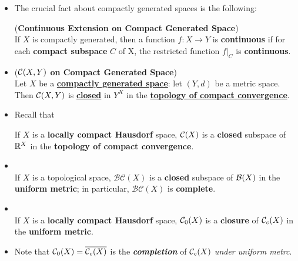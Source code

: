 \documentclass[11pt]{article}
\begin{document}
\begin{itemize}
\item The crucial fact about compactly generated spaces is the following:
\begin{lemma} (\textbf{Continuous Extension on Compact Generated Space})  \citep{munkres2000topology}\\
If $X$ is compactly generated, then a function $f : X \rightarrow Y$ is \textbf{continuous} if for each \textbf{compact subspace} $C$ of X, the restricted function $f |_{C}$ is \textbf{continuous}.
\end{lemma}

\item \begin{theorem} (\textbf{${\mathcal C}(X, Y)$ on Compact Generated Space})  \citep{munkres2000topology}\\
Let $X$ be a \underline{\textbf{compactly generated space}}: let $(Y, d)$ be a metric space. Then ${\mathcal C}(X, Y)$ is \underline{\textbf{closed}} in $Y^X$ in the \underline{\textbf{topology of compact convergence}}.
\end{theorem}

\item Recall that 
\begin{proposition}
If $X$ is a \textbf{locally compact Hausdorf} space, ${\mathcal C}(X)$ is a \textbf{closed} subspace of ${\mathbb R}^{X}$ in the \textbf{topology of compact convergence}.
\end{proposition}

\item \begin{proposition} \citep{folland2013real}\\
If $X$ is a topological space, $\mathcal{BC}(X)$ is a \textbf{closed} subspace of ${\mathcal B}(X)$ in the \textbf{uniform metric}; in particular, $\mathcal{BC}(X)$ is \textbf{complete}.
\end{proposition}

\item \begin{proposition}\citep{folland2013real}\\
If $X$ is a \textbf{locally compact Hausdorf} space, ${\mathcal C}_{0}(X)$ is a \textbf{closure} of ${\mathcal C}_{c}(X)$ in the \textbf{uniform metric}.
\end{proposition}

\item \begin{remark}
Note that ${\mathcal C}_0(X) = \overline{{\mathcal C}_c(X)}$ is the \emph{\textbf{completion}} of ${\mathcal C}_c(X)$ \emph{under uniform metrc}.
\end{remark}
\end{itemize}
\end{document}
